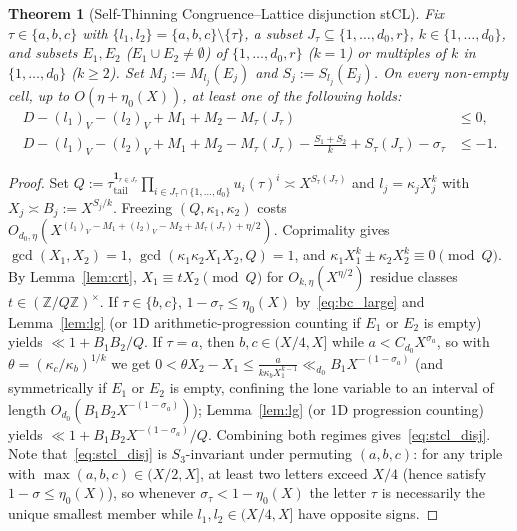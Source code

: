 \documentclass[11pt,a4paper]{amsart}
\theoremstyle{plain}
\newtheorem{theorem}{Theorem}[section]
\theoremstyle{definition}
\theoremstyle{remark}
\newcommand{\Z}{\mathbb{Z}}
\begin{document}
\begin{theorem}[Self-Thinning Congruence--Lattice disjunction \textsf{stCL}]\label{thm:stcl}
Fix $\tau \in \{a,b,c\}$ with $\{l_1,l_2\} = \{a,b,c\}\setminus\{\tau\}$, a subset $J_\tau \subseteq \{1,\dots,d_0,r\}$, $k \in \{1,\dots,d_0\}$, and subsets $E_1, E_2$ ($E_1 \cup E_2 \neq \emptyset$) of $\{1,\dots,d_0,r\}$ ($k=1$) or multiples of $k$ in $\{1,\dots,d_0\}$ ($k \ge 2$). Set $M_j := M_{l_j}(E_j)$ and $S_j := S_{l_j}(E_j)$. On every non-empty cell, up to $O(\eta + \eta_0(X))$, at least one of the following holds:
\begin{equation}\label{eq:stcl_disj}
\begin{aligned}
  D - (l_1)_V - (l_2)_V + M_1 + M_2 - M_\tau(J_\tau) &\le 0, \\
  D - (l_1)_V - (l_2)_V + M_1 + M_2 - M_\tau(J_\tau) - \frac{S_1 + S_2}{k} + S_\tau(J_\tau) - \sigma_\tau &\le -1.
\end{aligned}
\end{equation}
\end{theorem}
\begin{proof}
Set $Q := \tau_{\mathrm{tail}}^{\mathbf{1}_{r \in J_\tau}} \prod_{i \in J_\tau \cap \{1,\dots,d_0\}} u_i(\tau)^i \asymp X^{S_\tau(J_\tau)}$ and $l_j = \kappa_j X_j^k$ with $X_j \asymp B_j := X^{S_j/k}$. Freezing $(Q, \kappa_1, \kappa_2)$ costs $O_{d_0,\eta}(X^{(l_1)_V - M_1 + (l_2)_V - M_2 + M_\tau(J_\tau) + \eta/2})$. Coprimality gives $\gcd(X_1, X_2) = 1$, $\gcd(\kappa_1\kappa_2 X_1 X_2, Q) = 1$, and $\kappa_1 X_1^k \pm \kappa_2 X_2^k \equiv 0 \pmod Q$. By Lemma~\ref{lem:crt}, $X_1 \equiv t X_2 \pmod Q$ for $O_{k,\eta}(X^{\eta/2})$ residue classes $t \in (\Z/Q\Z)^\times$. If $\tau \in \{b,c\}$, $1 - \sigma_\tau \le \eta_0(X)$ by~\eqref{eq:bc_large} and Lemma~\ref{lem:lg} (or 1D arithmetic-progression counting if $E_1$ or $E_2$ is empty) yields $\ll 1 + B_1 B_2 / Q$. If $\tau = a$, then $b, c \in (X/4, X]$ while $a < C_{d_0} X^{\sigma_a}$, so with $\theta = (\kappa_c/\kappa_b)^{1/k}$ we get $0 < \theta X_2 - X_1 \le \frac{a}{k \kappa_b X_1^{k-1}} \ll_{d_0} B_1 X^{-(1-\sigma_a)}$ (and symmetrically if $E_1$ or $E_2$ is empty, confining the lone variable to an interval of length $O_{d_0}(B_1 B_2 X^{-(1-\sigma_a)})$); Lemma~\ref{lem:lg} (or 1D progression counting) yields $\ll 1 + B_1 B_2 X^{-(1-\sigma_a)} / Q$. Combining both regimes gives~\eqref{eq:stcl_disj}. Note that~\eqref{eq:stcl_disj} is $S_3$-invariant under permuting $(a,b,c)$: for any triple with $\max(a,b,c) \in (X/2, X]$, at least two letters exceed $X/4$ (hence satisfy $1 - \sigma \le \eta_0(X)$), so whenever $\sigma_\tau < 1 - \eta_0(X)$ the letter $\tau$ is necessarily the unique smallest member while $l_1, l_2 \in (X/4, X]$ have opposite signs.
\end{proof}
\end{document}
